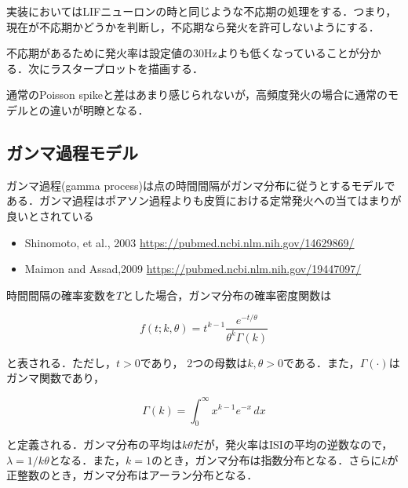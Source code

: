 実装においてはLIFニューロンの時と同じような不応期の処理をする．つまり，現在が不応期かどうかを判断し，不応期なら発火を許可しないようにする．

不応期があるために発火率は設定値の30Hzよりも低くなっていることが分かる．次にラスタープロットを描画する．


通常のPoisson spikeと差はあまり感じられないが，高頻度発火の場合に通常のモデルとの違いが明瞭となる．
\subsection{ガンマ過程モデル}
ガンマ過程(gamma process)は点の時間間隔がガンマ分布に従うとするモデルである．ガンマ過程はポアソン過程よりも皮質における定常発火への当てはまりが良いとされている
\begin{itemize}
\item Shinomoto, et al., 2003 \url{https://pubmed.ncbi.nlm.nih.gov/14629869/}
\item Maimon and Assad,2009 \url{https://pubmed.ncbi.nlm.nih.gov/19447097/}
\end{itemize}

時間間隔の確率変数を$T$とした場合，ガンマ分布の確率密度関数は


\begin{equation}
f(t;k,\theta) =  t^{k-1}\frac{e^{-t/\theta}}{\theta^k\Gamma(k)}
\end{equation}


と表される．ただし，$t > 0$であり， 2つの母数は$k, \theta > 0$である．また，$\Gamma (\cdot)$はガンマ関数であり，


\begin{equation}
\Gamma (k)=\int _{0}^{\infty }x^{k-1}e^{-x}\,dx
\end{equation}


と定義される．ガンマ分布の平均は$k\theta$だが，発火率はISIの平均の逆数なので，$\lambda=1/k\theta$となる．また，$k=1$のとき，ガンマ分布は指数分布となる．さらに$k$が正整数のとき，ガンマ分布はアーラン分布となる．

